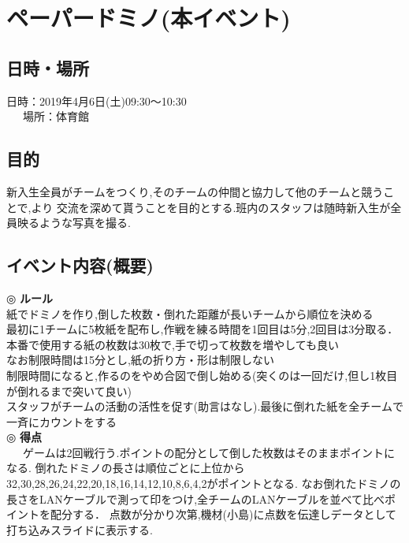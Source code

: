 \documentclass[a4j]{jarticle}
\begin{document}
\section{ペーパードミノ(本イベント)}
\subsection{日時・場所}
日時：2019年4月6日(土)09:30〜10:30\\
\ \ \ 場所：体育館\\
\subsection{目的}
新入生全員がチームをつくり,そのチームの仲間と協力して他のチームと競うことで,より
交流を深めて貰うことを目的とする.班内のスタッフは随時新入生が全員映るような写真を撮る.
\subsection{イベント内容(概要)}
\hspace{-5mm}
◎ \textbf{ルール} \\
紙でドミノを作り,倒した枚数・倒れた距離が長いチームから順位を決める \\
最初に1チームに5枚紙を配布し,作戦を練る時間を1回目は5分,2回目は3分取る．本番で使用する紙の枚数は30枚で,手で切って枚数を増やしても良い \\
なお制限時間は15分とし,紙の折り方・形は制限しない \\
制限時間になると,作るのをやめ合図で倒し始める(突くのは一回だけ,但し1枚目が倒れるまで突いて良い) \\
スタッフがチームの活動の活性を促す(助言はなし).最後に倒れた紙を全チームで一斉にカウントをする \\
◎ \textbf{得点} \\
\ \ \ ゲームは2回戦行う.ポイントの配分として倒した枚数はそのままポイントになる.
倒れたドミノの長さは順位ごとに上位から32,30,28,26,24,22,20,18,16,14,12,10,8,6,4,2がポイントとなる.
なお倒れたドミノの長さをLANケーブルで測って印をつけ,全チームのLANケーブルを並べて比べポイントを配分する．
点数が分かり次第,機材(小島)に点数を伝達しデータとして打ち込みスライドに表示する.
\end{document}
